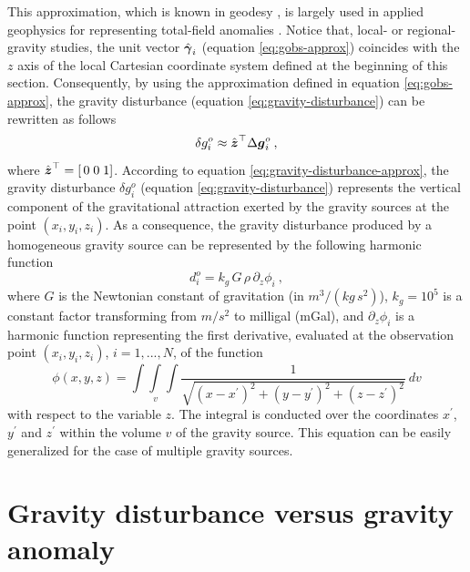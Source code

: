 \documentclass[extra]{gji}
\begin{document}
This approximation, which is known in geodesy \citep[e.g.,][]{sanso_sideris2013},
is largely used in applied geophysics for representing
total-field anomalies \citep[e.g.,][]{blakely1996}.
Notice that, local- or regional-gravity studies, the unit
vector $\hat{\mitbf{\gamma}}_{i}$ (equation \ref{eq:gobs-approx}) 
coincides with the $z$ axis
of the local Cartesian coordinate system defined
at the beginning of this section. Consequently,
by using the approximation defined in equation \ref{eq:gobs-approx}, 
the gravity disturbance (equation \ref{eq:gravity-disturbance}) can be 
rewritten as follows \begin{equation}
\delta g^{o}_{i} \approx \hat{\mitbf{z}}^{\top} \Delta \mitbf{g}^{o}_{i} \: ,
\label{eq:gravity-disturbance-approx}
\end{equation}
where $\hat{\mitbf{z}}^{\top} = \left[ \, 0 \; 0 \; 1 \right]$.
According to equation \ref{eq:gravity-disturbance-approx},
the gravity disturbance $\delta g^{o}_{i}$ (equation \ref{eq:gravity-disturbance})
represents the vertical component of the gravitational attraction exerted by
the gravity sources at the point $(x_{i}, y_{i}, z_{i})$.
As a consequence, the gravity disturbance produced by
a homogeneous gravity source can be represented 
by the following harmonic function
\begin{equation}
d^{o}_{i} = k_{g} \, G \, \rho \, \partial_{z} \phi_{i} \: ,
\label{eq:gz-local}
\end{equation}
where $G$ is the Newtonian constant of gravitation
(in $m^{3} / (kg \, s^{2})$),
$k_{g} = 10^{5}$ is a constant factor
transforming from $m/s^{2}$ to milligal (mGal),
and $\partial_{z} \phi_{i}$ is a harmonic function representing the first 
derivative, evaluated at the observation point $(x_{i},y_{i},z_{i})$, 
$i = 1, ..., N$, of the function 
\begin{equation}
\phi(x,y,z) = \int\int\limits_{v}\int \frac{1}{\sqrt{(x - x^{\prime})^{2} + 
(y - y^{\prime})^{2} + (z - z^{\prime})^{2}}} \: dv
\label{eq:phi}
\end{equation}
with respect to the variable $z$. The 
integral is conducted over the coordinates $x^{\prime}$, $y^{\prime}$ 
and $z^{\prime}$ within the volume $v$ of the gravity source.
This equation can be easily generalized for the case
of multiple gravity sources.

\section{Gravity disturbance versus gravity anomaly}
\end{document}
